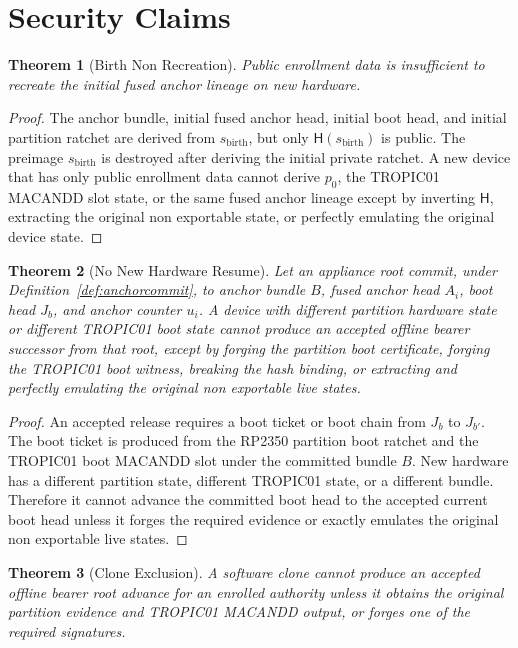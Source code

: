 \documentclass[11pt]{article}
\newtheorem{theorem}{Theorem}
\theoremstyle{definition}
\theoremstyle{remark}
\newcommand{\Hf}{\ensuremath{\mathsf{H}}}
\newcommand{\Bundle}{\ensuremath{B}}
\newcommand{\Ahead}{\ensuremath{A}}
\newcommand{\Bhead}{\ensuremath{J}}
\begin{document}
\section{Security Claims}

\begin{theorem}[Birth Non Recreation]
Public enrollment data is insufficient to recreate the initial fused anchor lineage on new
hardware.
\end{theorem}

\begin{proof}
The anchor bundle, initial fused anchor head, initial boot head, and initial partition ratchet are
derived from \(s_{\mathrm{birth}}\), but only \(\Hf(s_{\mathrm{birth}})\) is public. The preimage
\(s_{\mathrm{birth}}\) is destroyed after deriving the initial private ratchet. A new device that
has only public enrollment data cannot derive \(p_0\), the TROPIC01 MACANDD slot state, or the
same fused anchor lineage except by inverting \(\Hf\), extracting the original non exportable
state, or perfectly emulating the original device state.
\end{proof}

\begin{theorem}[No New Hardware Resume]
Let an appliance root commit, under Definition~\ref{def:anchorcommit}, to anchor bundle
\(\Bundle\), fused anchor head \(\Ahead_i\), boot head \(\Bhead_b\), and anchor counter \(u_i\). A device with different partition hardware state or
different TROPIC01 boot state cannot produce an accepted offline bearer successor from that root,
except by forging the partition boot certificate, forging the TROPIC01 boot witness, breaking the
hash binding, or extracting and perfectly emulating the original non exportable live states.
\end{theorem}

\begin{proof}
An accepted release requires a boot ticket or boot chain from \(\Bhead_b\) to \(\Bhead_{b'}\).
The boot ticket is produced from the RP2350 partition boot ratchet and the TROPIC01 boot MACANDD
slot under the committed bundle \(\Bundle\). New hardware has a different partition state,
different TROPIC01 state, or a different bundle. Therefore it cannot advance the committed boot
head to the accepted current boot head unless it forges the required evidence or exactly emulates
the original non exportable live states.
\end{proof}

\begin{theorem}[Clone Exclusion]
A software clone cannot produce an accepted offline bearer root advance for an enrolled authority
unless it obtains the original partition evidence and TROPIC01 MACANDD output, or forges one of
the required signatures.
\end{theorem}
\end{document}

